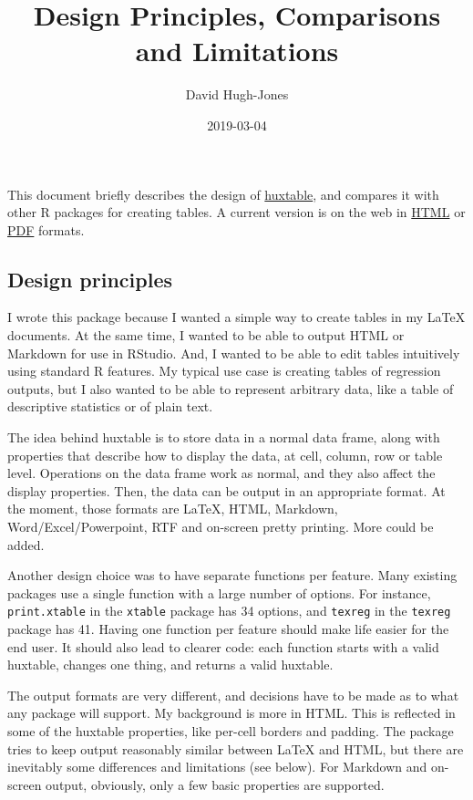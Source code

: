\documentclass[]{article}
\title{Design Principles, Comparisons and Limitations}
\author{David Hugh-Jones}
\date{2019-03-04}
\begin{document}
\maketitle

This document briefly describes the design of
\href{https://hughjonesd.github.io/huxtable}{huxtable}, and compares it
with other R packages for creating tables. A current version is on the
web in
\href{http://hughjonesd.github.io/huxtable/design-principles.html}{HTML}
or
\href{http://hughjonesd.github.io/huxtable/design-principles.pdf}{PDF}
formats.

\hypertarget{design-principles}{%
\subsection{Design principles}\label{design-principles}}

I wrote this package because I wanted a simple way to create tables in
my LaTeX documents. At the same time, I wanted to be able to output HTML
or Markdown for use in RStudio. And, I wanted to be able to edit tables
intuitively using standard R features. My typical use case is creating
tables of regression outputs, but I also wanted to be able to represent
arbitrary data, like a table of descriptive statistics or of plain text.

The idea behind huxtable is to store data in a normal data frame, along
with properties that describe how to display the data, at cell, column,
row or table level. Operations on the data frame work as normal, and
they also affect the display properties. Then, the data can be output in
an appropriate format. At the moment, those formats are LaTeX, HTML,
Markdown, Word/Excel/Powerpoint, RTF and on-screen pretty printing. More
could be added.

Another design choice was to have separate functions per feature. Many
existing packages use a single function with a large number of options.
For instance, \texttt{print.xtable} in the \texttt{xtable} package has
34 options, and \texttt{texreg} in the \texttt{texreg} package has 41.
Having one function per feature should make life easier for the end
user. It should also lead to clearer code: each function starts with a
valid huxtable, changes one thing, and returns a valid huxtable.

The output formats are very different, and decisions have to be made as
to what any package will support. My background is more in HTML. This is
reflected in some of the huxtable properties, like per-cell borders and
padding. The package tries to keep output reasonably similar between
LaTeX and HTML, but there are inevitably some differences and
limitations (see below). For Markdown and on-screen output, obviously,
only a few basic properties are supported.
\end{document}
